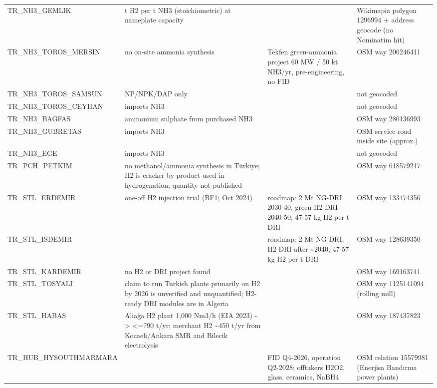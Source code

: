 \documentclass[11pt,a4paper]{article}
\begin{document}
\begin{landscape}
{\begin{longtable}{>{\raggedright\arraybackslash}p{2.25cm}>{\raggedright\arraybackslash}p{11.81cm}>{\raggedright\arraybackslash}p{5.40cm}>{\raggedright\arraybackslash}p{4.13cm}}
TR\_\allowbreak{}NH3\_\allowbreak{}GEMLIK & 0.1776 t H2 per t NH3 (stoichiometric) at nameplate capacity &  & Wikimapia polygon 1296994 + address geocode (no Nominatim hit) \\
TR\_\allowbreak{}NH3\_\allowbreak{}TOROS\_\allowbreak{}MERSIN & no on-site ammonia synthesis & Tekfen green-ammonia project 60 MW /\allowbreak{} 50 kt NH3/\allowbreak{}yr, pre-engineering, no FID & OSM way 206246411 \\
TR\_\allowbreak{}NH3\_\allowbreak{}TOROS\_\allowbreak{}SAMSUN & NP/\allowbreak{}NPK/\allowbreak{}DAP only &  & not geocoded \\
TR\_\allowbreak{}NH3\_\allowbreak{}TOROS\_\allowbreak{}CEYHAN & imports NH3 &  & not geocoded \\
TR\_\allowbreak{}NH3\_\allowbreak{}BAGFAS & ammonium sulphate from purchased NH3 &  & OSM way 280136993 \\
TR\_\allowbreak{}NH3\_\allowbreak{}GUBRETAS & imports NH3 &  & OSM service road inside site (approx.) \\
TR\_\allowbreak{}NH3\_\allowbreak{}EGE & imports NH3 &  & not geocoded \\
TR\_\allowbreak{}PCH\_\allowbreak{}PETKIM & no methanol/\allowbreak{}ammonia synthesis in Türkiye; H2 is cracker by-product used in hydrogenation; quantity not published &  & OSM way 618579217 \\
TR\_\allowbreak{}STL\_\allowbreak{}ERDEMIR & one-off H2 injection trial (BF1; Oct 2024) & roadmap: 2 Mt NG-DRI 2030-40, green-H2 DRI 2040-50; 47-57 kg H2 per t DRI & OSM way 133474356 \\
TR\_\allowbreak{}STL\_\allowbreak{}ISDEMIR &  & roadmap: 2 Mt NG-DRI, H2-DRI after \textasciitilde{}2040; 47-57 kg H2 per t DRI & OSM way 128639350 \\
TR\_\allowbreak{}STL\_\allowbreak{}KARDEMIR & no H2 or DRI project found &  & OSM way 169163741 \\
TR\_\allowbreak{}STL\_\allowbreak{}TOSYALI & 2023 claim to run Turkish plants primarily on H2 by 2026 is unverified and unquantified; H2-ready DRI modules are in Algeria &  & OSM way 1125141094 (rolling mill) \\
TR\_\allowbreak{}STL\_\allowbreak{}HABAS & Aliağa H2 plant 1,000 Nm3/\allowbreak{}h (EIA 2023) -> <=790 t/\allowbreak{}yr; merchant H2 \textasciitilde{}450 t/\allowbreak{}yr from Kocaeli/\allowbreak{}Ankara SMR and Bilecik electrolysis &  & OSM way 187437823 \\
TR\_\allowbreak{}HUB\_\allowbreak{}HYSOUTHM\allowbreak{}ARMARA &  & FID Q4-2026, operation Q2-2028; offtakers H2O2, glass, ceramics, NaBH4 & OSM relation 15579981 (Enerjisa Bandırma power plants) \\
\end{longtable}
}

\end{landscape}
\end{document}
